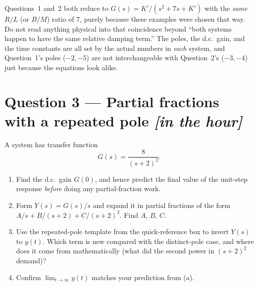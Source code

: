 \documentclass[11pt,a4paper]{article}
\newcommand{\inhour}{\hfill{\small\color{faccent}\itshape[in the hour]}}
\begin{document}
\begin{pitfall}
Questions~1 and~2 both reduce to $G(s)=K'/(s^2+7s+K')$ with the \emph{same}
$R/L$ (or $B/M$) ratio of $7$, purely because these examples were chosen that
way. Do not read anything physical into that coincidence beyond ``both
systems happen to have the same relative damping term.'' The poles, the
d.c.\ gain, and the time constants are all set by the actual numbers in
\emph{each} system, and Question~1's poles ($-2,-5$) are not interchangeable
with Question~2's ($-3,-4$) just because the equations look alike.
\end{pitfall}

\section*{Question 3 --- Partial fractions with a repeated pole \inhour}

A system has transfer function
\[
  G(s)=\frac{8}{(s+2)^2}.
\]

\begin{enumerate}[label=(\alph*)]
\item Find the d.c.\ gain $G(0)$, and hence predict the final value of the
      unit-step response \emph{before} doing any partial-fraction work.
\item Form $Y(s)=G(s)/s$ and expand it in partial fractions of the form
      $A/s+B/(s+2)+C/(s+2)^2$. Find $A$, $B$, $C$.
\item Use the repeated-pole template from the quick-reference box to invert
      $Y(s)$ to $y(t)$. Which term is new compared with the distinct-pole
      case, and where does it come from mathematically (what did the second
      power in $(s+2)^2$ demand)?
\item Confirm $\lim_{t\to\infty}y(t)$ matches your prediction from (a).
\end{enumerate}
\end{document}
